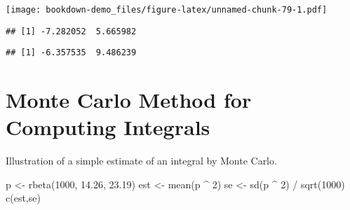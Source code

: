\documentclass[
]{book}
\newenvironment{Shaded}{\begin{snugshade}}{\end{snugshade}}
\newcommand{\DecValTok}[1]{\textcolor[rgb]{0.00,0.00,0.81}{#1}}
\newcommand{\FloatTok}[1]{\textcolor[rgb]{0.00,0.00,0.81}{#1}}
\newcommand{\FunctionTok}[1]{\textcolor[rgb]{0.00,0.00,0.00}{#1}}
\newcommand{\NormalTok}[1]{#1}
\newcommand{\OtherTok}[1]{\textcolor[rgb]{0.56,0.35,0.01}{#1}}
\newcommand{\SpecialCharTok}[1]{\textcolor[rgb]{0.00,0.00,0.00}{#1}}
\begin{document}
\texttt{[image: bookdown-demo\_files/figure-latex/unnamed-chunk-79-1.pdf]}

\begin{Shaded}
\end{Shaded}

\begin{verbatim}
## [1] -7.282052  5.665982
\end{verbatim}

\begin{Shaded}
\end{Shaded}

\begin{verbatim}
## [1] -6.357535  9.486239
\end{verbatim}

\hypertarget{monte-carlo-method-for-computing-integrals}{%
\section{Monte Carlo Method for Computing Integrals}\label{monte-carlo-method-for-computing-integrals}}

Illustration of a simple estimate of an integral by Monte Carlo.

\begin{Shaded}
\begin{Highlighting}[]
\NormalTok{p }\OtherTok{\textless{}{-}} \FunctionTok{rbeta}\NormalTok{(}\DecValTok{1000}\NormalTok{, }\FloatTok{14.26}\NormalTok{, }\FloatTok{23.19}\NormalTok{)}
\NormalTok{est }\OtherTok{\textless{}{-}} \FunctionTok{mean}\NormalTok{(p }\SpecialCharTok{\^{}} \DecValTok{2}\NormalTok{)}
\NormalTok{se }\OtherTok{\textless{}{-}} \FunctionTok{sd}\NormalTok{(p }\SpecialCharTok{\^{}} \DecValTok{2}\NormalTok{) }\SpecialCharTok{/} \FunctionTok{sqrt}\NormalTok{(}\DecValTok{1000}\NormalTok{)}
\FunctionTok{c}\NormalTok{(est,se)}
\end{Highlighting}
\end{Shaded}
\end{document}

